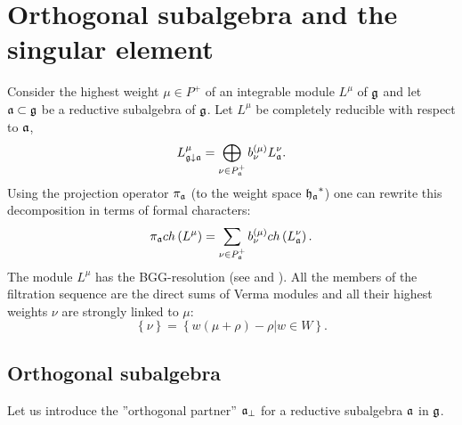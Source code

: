 \documentclass[12pt]{article}
\theoremstyle{definition}
\begin{document}
\section{Orthogonal subalgebra and the singular element}

\label{sec:recurr-form-branch}

Consider the highest weight $\mu \in P^{+}$ of an integrable module $L^{\mu
} $ of $\frak{g}$ and let $\frak{a}\subset \frak{g}$ be a reductive
subalgebra of $\frak{g}$. Let $L^{\mu }$ be completely reducible with
respect to $\frak{a}$, 
\[
L_{\frak{g}\downarrow \frak{a}}^{\mu }=\bigoplus\limits_{\nu \in P_{\frak{a}%
}^{+}}b_{\nu }^{\left( \mu \right) }L_{\frak{a}}^{\nu }. 
\]
Using the projection operator $\pi _{\frak{a}}$ (to the weight space $\frak{%
h_{a}}^{\ast }$) one can rewrite this decomposition in terms of formal
characters: 
\begin{equation}
\pi _{\frak{a}}ch\left( L^{\mu }\right) =\sum_{\nu \in P_{\frak{a}%
}^{+}}b_{\nu }^{(\mu )}ch\left( L_{\frak{a}}^{\nu }\right) .
\label{branching1}
\end{equation}
The module $L^{\mu }$ has the BGG-resolution (see
\cite{bernstein1976category,bernstein1975differential,bernstein1971structure} and \cite{humphreys2008representations}). All
the members of the filtration sequence are the direct sums of Verma modules
and all their highest weights $\nu $ are strongly linked to $\mu $: 
\[
\left\{ \nu \right\} =\left\{ w\left( \mu +\rho \right) -\rho |w\in
W\right\} . 
\]

\subsection{Orthogonal subalgebra}

Let us introduce the ''orthogonal partner'' $\frak{a}_{\bot }$ for a
reductive subalgebra $\frak{a}$ in $\frak{g}$.
\end{document}
